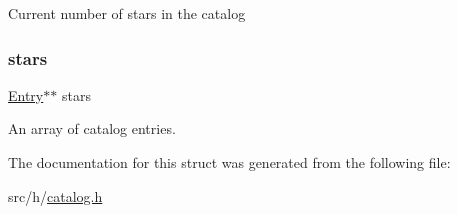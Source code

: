 Current number of stars in the catalog \mbox{\label{struct_catalog_ae9a5d6bc40976d00eef67a78d939d3d3}} 
\subsubsection{\texorpdfstring{stars}{stars}}
{\footnotesize\ttfamily \mbox{\hyperlink{struct_entry}{Entry}}$\ast$$\ast$ stars}

An array of catalog entries. 

The documentation for this struct was generated from the following file\+:\begin{DoxyCompactItemize}
\item 
src/h/\mbox{\hyperlink{catalog_8h}{catalog.\+h}}\end{DoxyCompactItemize}

